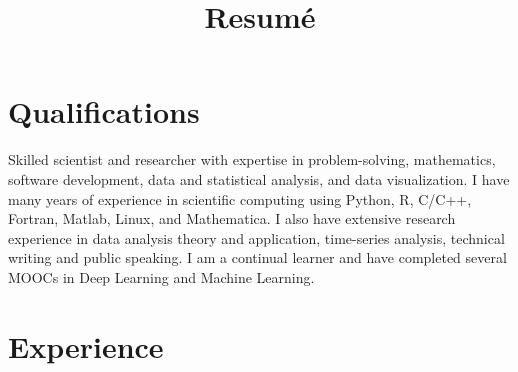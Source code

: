 \documentclass[11pt,letterpaper,sans]{moderncv} %
\title{Resum\'{e}}
\begin{document}
\makecvtitle %


\section{Qualifications}
\vspace{6pt}

Skilled scientist and researcher with expertise in problem-solving, mathematics, software development, data and statistical analysis, and data visualization. I have many years of experience in scientific computing using Python, R, C/C++, Fortran, Matlab, Linux, and Mathematica. I also have extensive research experience in data analysis theory and application, time-series analysis, technical writing and public speaking. I am a continual learner and have completed several MOOCs in Deep Learning and Machine Learning. 

%


\section{Experience}
\vspace{6pt}
\end{document}
